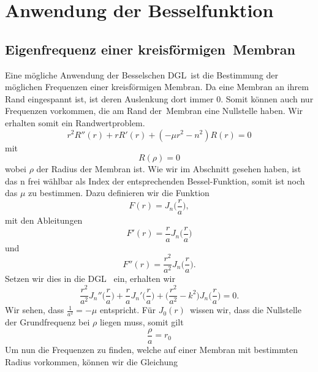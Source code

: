 \section{Anwendung der Besselfunktion}
\subsection[Eigenfrequenz einer kreisförmigen Membram]{Eigenfrequenz einer kreisförmigen Membran}

Eine mögliche Anwendung der Besselschen DGL ist die Bestimmung der möglichen Frequenzen einer kreisförmigen Membran. 
Da eine Membran an ihrem Rand eingespannt ist, ist deren Auslenkung dort immer 0. Somit können auch nur Frequenzen vorkommen, die am Rand der Membran eine Nullstelle haben. Wir erhalten somit ein Randwertproblem.
\begin{equation}
r^2 R''(r) + r R'(r) + (-\mu r^2 - n^2)R(r) = 0
\label{eq:dglmitmu}
\end{equation}
mit 
\begin{equation}
R(\rho) = 0
\end{equation}
wobei $\rho$ der Radius der Membran ist.
Wie wir im Abschnitt  gesehen haben, ist das n frei wählbar als Index der entsprechenden Bessel-Funktion, somit ist noch das $\mu$ zu bestimmen. 
Dazu definieren wir die Funktion
\begin{equation}
F(r) = J_n \biggl(\frac{r}{a} \biggr),
\end{equation}
mit den Ableitungen
\begin{equation}
F'(r) = \frac{r}{a} J_n \biggl(\frac{r}{a} \biggr)
\end{equation}
und 
\begin{equation}
F''(r) = \frac{r^2}{a^2} J_n \biggl(\frac{r}{a} \biggr).
\end{equation}
Setzen wir dies in die DGL  ein, erhalten wir
\begin{equation}
\frac{r^2}{a^2}J_n''\biggl(\frac{r}{a} \biggr) + 
\frac{r}{a}J_n'\biggl(\frac{r}{a} \biggr) + 
\biggl(\frac{r^2}{a^2} - k^2\biggr)J_n\biggl(\frac{r}{a}\biggr) = 0.
\end{equation}
Wir sehen, dass $\frac{1}{a^2}=-\mu$ entspricht.
Für $J_0(r)$ wissen wir, dass die Nullstelle der Grundfrequenz bei $\rho$ liegen muss, somit gilt
\begin{equation}
\frac{\rho}{a} = r_0
\end{equation}
Um nun die Frequenzen zu finden, welche auf einer Membran mit bestimmten Radius vorkommen, können wir die Gleichung
